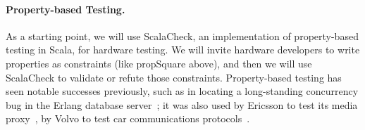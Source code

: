 \documentclass[fleqn,12pt]{article}
\newcommand{\todo}[1]{{\it TODO: #1}}
\begin{document}
\paragraph{Property-based Testing.}
As a starting point, we will use ScalaCheck, an implementation of
property-based testing in Scala, for hardware testing. We will invite
hardware developers to write properties as constraints (like
propSquare above), and then we will use ScalaCheck to validate or
refute those constraints. Property-based testing has seen notable
successes previously, such as in locating a long-standing concurrency
bug in the Erlang database server~\cite{DBLP:conf/erlang/HughesB11};
it was also used by Ericsson to test its media
proxy~\cite{DBLP:conf/erlang/ArtsHJW06}, by Volvo to test car
communications protocols~\cite{DBLP:conf/icst/ArtsHNS15}.


%
%
%
%
\end{document}
